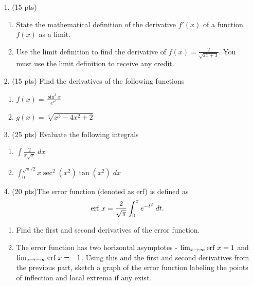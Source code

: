 \documentclass[11pt,reqno]{article}
\theoremstyle{definition}
\begin{document}
	\begin{enumerate}
		\item[1.]  (15 pts) 
		\begin{enumerate}
			
			\item State the mathematical definition of the derivative $f'(x)$ of a function $f(x)$ as a limit.
			
			\vspace{1.5in}
			
			\item Use the limit definition to find the derivative of $f(x)=\frac{2}{\sqrt{2x+3}}$. You must use the limit definition to receive any credit.
			
		\end{enumerate}
		\newpage
		\item[2.](15 pts) Find the derivatives of the following functions
		\begin{enumerate}
			\item $f(x) = \frac{\sin^3 x}{e^{x^2}}$ 
			\vspace{10cm}
			\item $g(x) = \sqrt[4]{x^3 - 4x^2 + 2}$
		\end{enumerate}
		\newpage
		\item[3.](25 pts) Evaluate the following integrals
			\begin{enumerate}
				\item $\int \frac{2}{x\sqrt{x}} \; dx$ 
				\vspace{6cm}
				\item $\int_{0}^{\sqrt{\pi}/2} x \sec^2 (x^2) \tan(x^2) \;dx$
			\end{enumerate}
		\newpage
		\item[4.] (20 pts)The error function (denoted as erf) is defined as $$\textnormal{erf }x = \frac{2}{\sqrt{\pi}} \int_{0}^{x} e^{-t^2} \; dt.$$ 
		\begin{enumerate}
			\item Find the first and second derivatives of the error function.
			\vspace{5cm}
			\item The error function has two horizontal asymptotes - $\lim_{x \to \infty} \textnormal{erf } x = 1$ and $\lim_{x \to -\infty} \textnormal{erf } x = -1$. Using this and the first and second derivatives from the previous part, sketch a graph of the error function labeling the points of inflection and local extrema if any exist.

\end{enumerate}
\end{enumerate}
\end{document}
